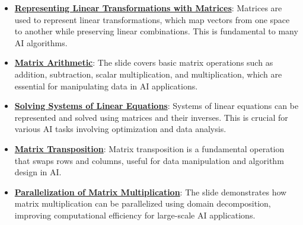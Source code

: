 \documentclass{article}%
\begin{document}
\begin{itemize}[leftmargin=*]%
\item \href{https://purdue.brightspace.com/d2l/common/assets/pdfjs-d2l-dist/1.0.14-legacy/web/viewer.html?file=\%2Fcontent\%2Fenforced\%2F1095467-wl.202510.CS.24300.001\%2F04L1-Linear Algebra Primer.pdf\%3Fou\%3D1095467\&lang=en-us\&container=d2l-fileviewer-rendered-pdf\&fullscreen=d2l-fileviewer-rendered-pdf-dialog\&height=667#page=5}{\textbf{Representing Linear Transformations with Matrices}}: Matrices are used to represent linear transformations, which map vectors from one space to another while preserving linear combinations. This is fundamental to many AI algorithms.%
\item \href{https://purdue.brightspace.com/d2l/common/assets/pdfjs-d2l-dist/1.0.14-legacy/web/viewer.html?file=\%2Fcontent\%2Fenforced\%2F1095467-wl.202510.CS.24300.001\%2F04L1-Linear Algebra Primer.pdf\%3Fou\%3D1095467\&lang=en-us\&container=d2l-fileviewer-rendered-pdf\&fullscreen=d2l-fileviewer-rendered-pdf-dialog\&height=667#page=9}{\textbf{Matrix Arithmetic}}: The slide covers basic matrix operations such as addition, subtraction, scalar multiplication, and multiplication, which are essential for manipulating data in AI applications.%
\item \href{https://purdue.brightspace.com/d2l/common/assets/pdfjs-d2l-dist/1.0.14-legacy/web/viewer.html?file=\%2Fcontent\%2Fenforced\%2F1095467-wl.202510.CS.24300.001\%2F04L1-Linear Algebra Primer.pdf\%3Fou\%3D1095467\&lang=en-us\&container=d2l-fileviewer-rendered-pdf\&fullscreen=d2l-fileviewer-rendered-pdf-dialog\&height=667#page=11}{\textbf{Solving Systems of Linear Equations}}: Systems of linear equations can be represented and solved using matrices and their inverses. This is crucial for various AI tasks involving optimization and data analysis.%
\item \href{https://purdue.brightspace.com/d2l/common/assets/pdfjs-d2l-dist/1.0.14-legacy/web/viewer.html?file=\%2Fcontent\%2Fenforced\%2F1095467-wl.202510.CS.24300.001\%2F04L1-Linear Algebra Primer.pdf\%3Fou\%3D1095467\&lang=en-us\&container=d2l-fileviewer-rendered-pdf\&fullscreen=d2l-fileviewer-rendered-pdf-dialog\&height=667#page=16}{\textbf{Matrix Transposition}}: Matrix transposition is a fundamental operation that swaps rows and columns, useful for data manipulation and algorithm design in AI.%
\item \href{https://purdue.brightspace.com/d2l/common/assets/pdfjs-d2l-dist/1.0.14-legacy/web/viewer.html?file=\%2Fcontent\%2Fenforced\%2F1095467-wl.202510.CS.24300.001\%2F04L1-Linear Algebra Primer.pdf\%3Fou\%3D1095467\&lang=en-us\&container=d2l-fileviewer-rendered-pdf\&fullscreen=d2l-fileviewer-rendered-pdf-dialog\&height=667#page=18}{\textbf{Parallelization of Matrix Multiplication}}: The slide demonstrates how matrix multiplication can be parallelized using domain decomposition, improving computational efficiency for large{-}scale AI applications.%

\end{itemize}
\end{document}
